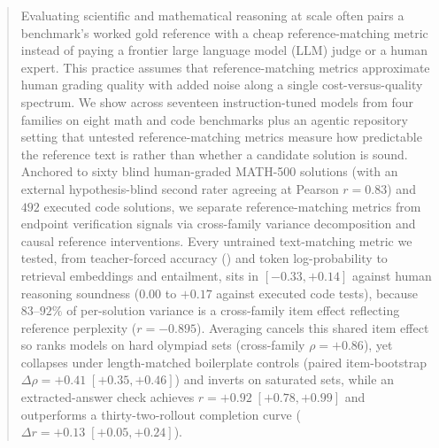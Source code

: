 \begin{abstract}
Evaluating scientific and mathematical reasoning at scale often pairs a benchmark's worked gold reference with a cheap reference-matching metric instead of paying a frontier large language model (LLM) judge or a human expert.
This practice assumes that reference-matching metrics approximate human grading quality with added noise along a single cost-versus-quality spectrum.
We show across seventeen instruction-tuned models from four families on eight math and code benchmarks plus an agentic repository setting that untested reference-matching metrics measure how predictable the reference text is rather than whether a candidate solution is sound.
Anchored to sixty blind human-graded \textsc{MATH-500} solutions (with an external hypothesis-blind second rater agreeing at Pearson $r = 0.83$) and $492$ executed code solutions, we separate reference-matching metrics from endpoint verification signals via cross-family variance decomposition and causal reference interventions.
Every untrained text-matching metric we tested, from teacher-forced accuracy (\tfa) and token log-probability to retrieval embeddings and entailment, sits in $[-0.33, +0.14]$ against human reasoning soundness ($0.00$ to $+0.17$ against executed code tests), because $83$--$92\%$ of \tfa{} per-solution variance is a cross-family item effect reflecting reference perplexity ($r = -0.895$).
Averaging cancels this shared item effect so \tfa{} ranks models on hard olympiad sets (cross-family $\rho = +0.86$), yet collapses under length-matched boilerplate controls (paired item-bootstrap $\Delta\rho = +0.41 \; [+0.35, +0.46]$) and inverts on saturated sets, while an extracted-answer check achieves $r = +0.92 \; [+0.78, +0.99]$ and outperforms a thirty-two-rollout completion curve ($\Delta r = +0.13 \; [+0.05, +0.24]$).

\end{abstract}
